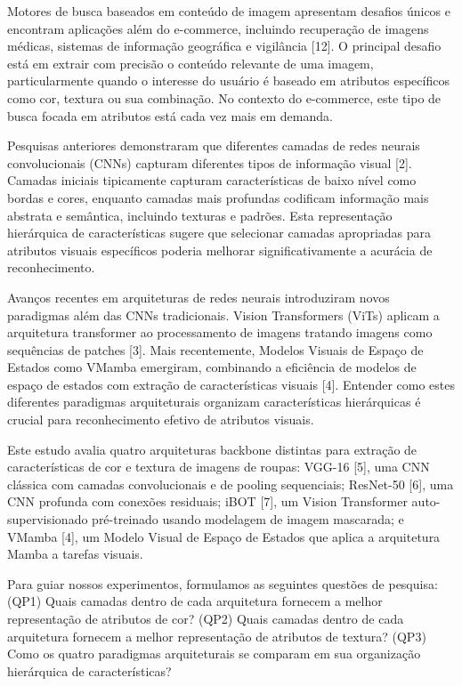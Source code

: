 \documentclass[conference]{IEEEtran}
\begin{document}
Motores de busca baseados em conteúdo de imagem apresentam desafios únicos e encontram aplicações além do e-commerce, incluindo recuperação de imagens médicas, sistemas de informação geográfica e vigilância [12]. O principal desafio está em extrair com precisão o conteúdo relevante de uma imagem, particularmente quando o interesse do usuário é baseado em atributos específicos como cor, textura ou sua combinação. No contexto do e-commerce, este tipo de busca focada em atributos está cada vez mais em demanda.

Pesquisas anteriores demonstraram que diferentes camadas de redes neurais convolucionais (CNNs) capturam diferentes tipos de informação visual [2]. Camadas iniciais tipicamente capturam características de baixo nível como bordas e cores, enquanto camadas mais profundas codificam informação mais abstrata e semântica, incluindo texturas e padrões. Esta representação hierárquica de características sugere que selecionar camadas apropriadas para atributos visuais específicos poderia melhorar significativamente a acurácia de reconhecimento.

Avanços recentes em arquiteturas de redes neurais introduziram novos paradigmas além das CNNs tradicionais. Vision Transformers (ViTs) aplicam a arquitetura transformer ao processamento de imagens tratando imagens como sequências de patches [3]. Mais recentemente, Modelos Visuais de Espaço de Estados como VMamba emergiram, combinando a eficiência de modelos de espaço de estados com extração de características visuais [4]. Entender como estes diferentes paradigmas arquiteturais organizam características hierárquicas é crucial para reconhecimento efetivo de atributos visuais.

Este estudo avalia quatro arquiteturas backbone distintas para extração de características de cor e textura de imagens de roupas: VGG-16 [5], uma CNN clássica com camadas convolucionais e de pooling sequenciais; ResNet-50 [6], uma CNN profunda com conexões residuais; iBOT [7], um Vision Transformer auto-supervisionado pré-treinado usando modelagem de imagem mascarada; e VMamba [4], um Modelo Visual de Espaço de Estados que aplica a arquitetura Mamba a tarefas visuais.

Para guiar nossos experimentos, formulamos as seguintes questões de pesquisa:
(QP1) Quais camadas dentro de cada arquitetura fornecem a melhor representação de atributos de cor?
(QP2) Quais camadas dentro de cada arquitetura fornecem a melhor representação de atributos de textura?
(QP3) Como os quatro paradigmas arquiteturais se comparam em sua organização hierárquica de características?
\end{document}
